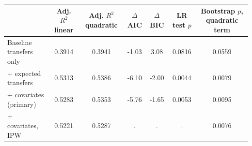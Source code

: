 \begin{tabular}{l*{6}{c}}
\toprule
            &Adj. $R^2$ linear&Adj. $R^2$ quadratic& $\Delta$AIC& $\Delta$BIC& LR test $p$&Bootstrap $p$, quadratic term\\
\midrule
Baseline transfers only&      0.3914&      0.3941&       -1.03&        3.08&      0.0816&      0.0559\\
+ expected transfers&      0.5313&      0.5386&       -6.10&       -2.00&      0.0044&      0.0079\\
+ covariates (primary)&      0.5283&      0.5353&       -5.76&       -1.65&      0.0053&      0.0095\\
+ covariates, IPW&      0.5221&      0.5287&           .&           .&           .&      0.0076\\
\bottomrule
\end{tabular}
